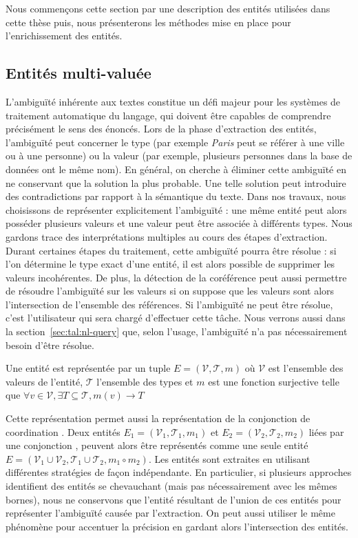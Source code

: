 Nous commençons cette section par une description des entités utilisées dans cette thèse puis, nous présenterons les méthodes mise en place pour l'enrichissement des entités.

\subsection{Entités multi-valuée}

L'ambiguïté inhérente aux textes constitue un défi majeur pour les systèmes de traitement automatique du langage, qui doivent être capables de comprendre précisément le sens des énoncés.
Lors de la phase d'extraction des entités, l'ambiguïté peut concerner le type (par exemple \textit{Paris} peut se référer à une ville ou à une personne) ou la valeur (par exemple, plusieurs personnes dans la base de données ont le même nom).
En général, on cherche à éliminer cette ambiguïté en ne conservant que la solution la plus probable.
Une telle solution peut introduire des contradictions par rapport à la sémantique du texte.
Dans nos travaux, nous choisissons de représenter explicitement l'ambiguïté : une même entité peut alors posséder plusieurs valeurs et une valeur peut être associée à différents types.
Nous gardons trace des interprétations multiples au cours des étapes d'extraction.
Durant certaines étapes du traitement, cette ambiguïté pourra être résolue : si l'on détermine le type exact d'une entité, il est alors possible de supprimer les valeurs incohérentes.
De plus, la détection de la coréférence peut aussi permettre de résoudre l'ambiguïté sur les valeurs si on suppose que les valeurs sont alors l'intersection de l'ensemble des références.
Si l'ambiguïté ne peut être résolue, c'est l'utilisateur qui sera chargé d'effectuer cette tâche.
Nous verrons aussi dans la section~\ref{sec:tal:nl-query} que, selon l'usage, l'ambiguïté n'a pas nécessairement besoin d'être résolue.

\begin{definition}
    Une entité est représentée par un tuple $E = (\mathcal{V}, \mathcal{T},  m)$ où $\mathcal{V}$ est l'ensemble des valeurs de l'entité, $\mathcal{T}$ l'ensemble des types et $m$ est une fonction surjective telle que $\forall v \in \mathcal{V}, \exists T \subseteq \mathcal{T}, m(v) \rightarrow T$
\end{definition}

Cette représentation permet aussi la représentation de la conjonction de coordination .
Deux entités $E_1 = (\mathcal{V}_1, \mathcal{T}_1, m_1)$ et $E_2 = (\mathcal{V}_2, \mathcal{T}_2, m_2)$ liées par une conjonction , peuvent alors être représentés comme une seule entité $E = (\mathcal{V}_1 \cup \mathcal{V}_2, \mathcal{T}_1 \cup \mathcal{T}_2, m_1 \circ m_2)$.
Les entités sont extraites en utilisant différentes stratégies de façon indépendante.
En particulier, si plusieurs approches identifient des entités se chevauchant (mais pas nécessairement avec les mêmes bornes), nous ne conservons que l'entité résultant de l'union de ces entités pour représenter l'ambiguïté causée par l'extraction.
On peut aussi utiliser le même phénomène pour accentuer la précision en gardant alors l'intersection des entités.

